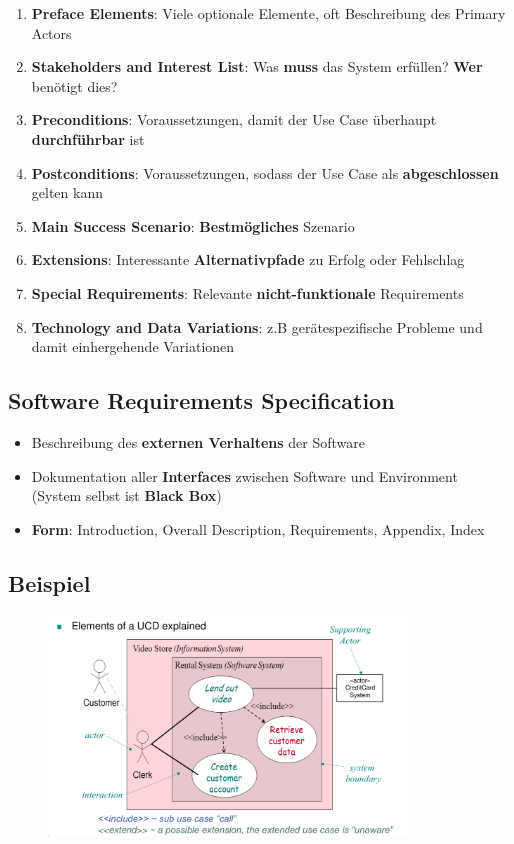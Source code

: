 \begin{enumerate}
	\item \textbf{Preface Elements}: Viele optionale Elemente, oft Beschreibung des Primary Actors
	\item \textbf{Stakeholders and Interest List}: Was \textbf{muss} das System erfüllen? \textbf{Wer} benötigt dies?
	\item \textbf{Preconditions}: Voraussetzungen, damit der Use Case überhaupt \textbf{durchführbar} ist
	\item \textbf{Postconditions}: Voraussetzungen, sodass der Use Case als \textbf{abgeschlossen} gelten kann
	\item \textbf{Main Success Scenario}: \textbf{Bestmögliches} Szenario
	\item \textbf{Extensions}: Interessante \textbf{Alternativpfade} zu Erfolg oder Fehlschlag
	\item \textbf{Special Requirements}: Relevante \textbf{nicht-funktionale} Requirements
	\item \textbf{Technology and Data Variations}: z.B gerätespezifische Probleme und damit einhergehende Variationen
\end{enumerate}

\subsection{Software Requirements Specification}
\label{uc:sub:software_requirements_specification}

\begin{itemize}
	\item Beschreibung des \textbf{externen Verhaltens} der Software
	\item Dokumentation aller \textbf{Interfaces} zwischen Software und Environment (System selbst ist \textbf{Black Box})
	\item \textbf{Form}: Introduction, Overall Description, Requirements, Appendix, Index
\end{itemize}

\subsection{Beispiel}
\label{uc:sub:beispiel}

\begin{figure}[!h]
	\centering
	\includegraphics[width=0.85\textwidth]{images/usecase.png}
\end{figure}